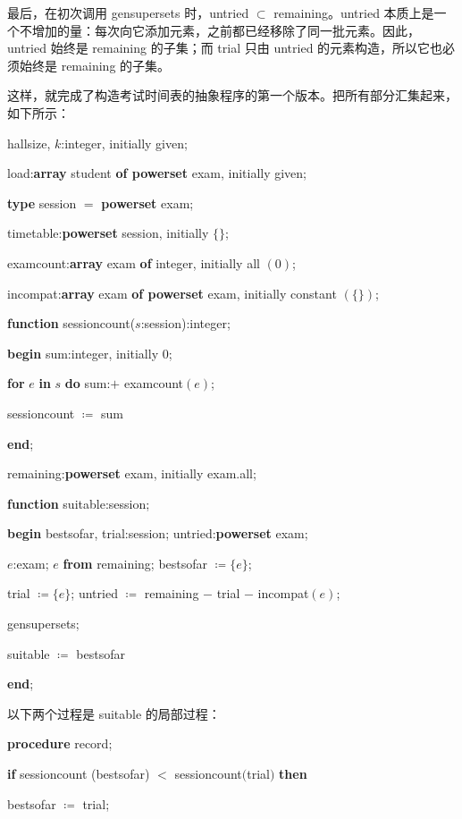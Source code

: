 最后，在初次调用 gensupersets 时，untried $\subset$ remaining。untried 本质上是一个不增加的量：每次向它添加元素，之前都已经移除了同一批元素。因此，untried 始终是 remaining 的子集；而 trial 只由 untried 的元素构造，所以它也必须始终是 remaining 的子集。

这样，就完成了构造考试时间表的抽象程序的第一个版本。把所有部分汇集起来，如下所示：

hallsize, $k$:integer, initially given;

load:\textbf{array} student \textbf{of powerset} exam, initially given;

\textbf{type} session $=$ \textbf{powerset} exam;

timetable:\textbf{powerset} session, initially $\{\}$;

examcount:\textbf{array} exam \textbf{of} integer, initially all $(0)$;

incompat:\textbf{array} exam \textbf{of powerset} exam, initially constant $(\{\})$;

\textbf{function} sessioncount($s$:session):integer;

\quad \textbf{begin} sum:integer, initially 0;

\quad \quad \textbf{for} $e$ \textbf{in} $s$ \textbf{do} sum:$+$ examcount$(e)$;

\quad \quad sessioncount $\coloneq$ sum

\quad \textbf{end};

\quad remaining:\textbf{powerset} exam, initially exam.all;

\textbf{function} suitable:session;

\quad \textbf{begin} bestsofar, trial:session; untried:\textbf{powerset} exam;

\quad \quad $e$:exam; $e$ \textbf{from} remaining; bestsofar $\coloneq \{e\}$;

\quad \quad trial $\coloneq \{e\}$; untried $\coloneq$ remaining $-$ trial $-$ incompat$(e)$;

\quad \quad gensupersets;

\quad \quad suitable $\coloneq$ bestsofar

\quad \textbf{end};

\noindent
以下两个过程是 suitable 的局部过程：

\quad \textbf{procedure} record;

\quad \quad \textbf{if} sessioncount (bestsofar) $<$ sessioncount$($trial$)$ \textbf{then} 

\quad \quad \quad bestsofar $\coloneq$ trial;

